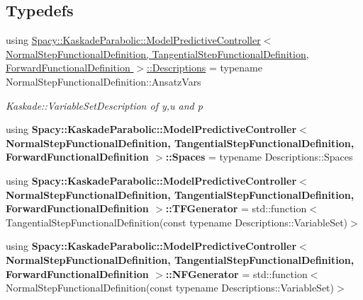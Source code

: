 \subsection*{Typedefs}
\begin{DoxyCompactItemize}
\item 
\hypertarget{group__KaskadeParabolicGroup_gab8c662bd21758959d061a447fb8d12b7}{using \hyperlink{group__KaskadeParabolicGroup_gab8c662bd21758959d061a447fb8d12b7}{Spacy\-::\-Kaskade\-Parabolic\-::\-Model\-Predictive\-Controller$<$ Normal\-Step\-Functional\-Definition, Tangential\-Step\-Functional\-Definition, Forward\-Functional\-Definition $>$\-::\-Descriptions} = typename Normal\-Step\-Functional\-Definition\-::\-Ansatz\-Vars}\label{group__KaskadeParabolicGroup_gab8c662bd21758959d061a447fb8d12b7}

\begin{DoxyCompactList}\small\item\em Kaskade\-::\-Variable\-Set\-Description of y,u and p \end{DoxyCompactList}\item 
\hypertarget{group__KaskadeParabolicGroup_ga8a6dce9eedafe41b5af13469a559bc9f}{using {\bfseries Spacy\-::\-Kaskade\-Parabolic\-::\-Model\-Predictive\-Controller$<$ Normal\-Step\-Functional\-Definition, Tangential\-Step\-Functional\-Definition, Forward\-Functional\-Definition $>$\-::\-Spaces} = typename Descriptions\-::\-Spaces}\label{group__KaskadeParabolicGroup_ga8a6dce9eedafe41b5af13469a559bc9f}

\item 
\hypertarget{group__KaskadeParabolicGroup_ga519b63b936eff2a895d9160ac95f3348}{using {\bfseries Spacy\-::\-Kaskade\-Parabolic\-::\-Model\-Predictive\-Controller$<$ Normal\-Step\-Functional\-Definition, Tangential\-Step\-Functional\-Definition, Forward\-Functional\-Definition $>$\-::\-T\-F\-Generator} = std\-::function$<$ Tangential\-Step\-Functional\-Definition(const typename Descriptions\-::\-Variable\-Set)$>$}\label{group__KaskadeParabolicGroup_ga519b63b936eff2a895d9160ac95f3348}

\item 
\hypertarget{group__KaskadeParabolicGroup_gaed4e57800f1a773e33b8073e8991975d}{using {\bfseries Spacy\-::\-Kaskade\-Parabolic\-::\-Model\-Predictive\-Controller$<$ Normal\-Step\-Functional\-Definition, Tangential\-Step\-Functional\-Definition, Forward\-Functional\-Definition $>$\-::\-N\-F\-Generator} = std\-::function$<$ Normal\-Step\-Functional\-Definition(const typename Descriptions\-::\-Variable\-Set)$>$}\label{group__KaskadeParabolicGroup_gaed4e57800f1a773e33b8073e8991975d}


\end{DoxyCompactItemize}
